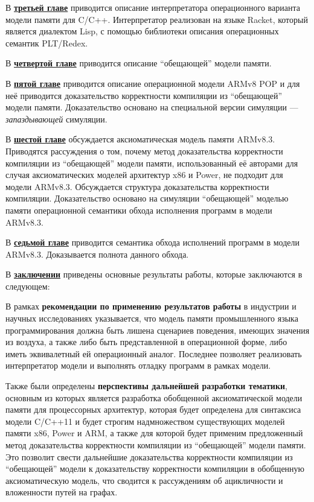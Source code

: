 В \underline{\textbf{третьей главе}} приводится описание интерпретатора операционного варианта модели памяти для C/C++.
Интерпретатор реализован на языке Racket, который является диалектом Lisp, с помощью библиотеки описания операционных
семантик PLT/Redex.

В \underline{\textbf{четвертой главе}} приводится описание ``обещающей'' модели памяти.

В \underline{\textbf{пятой главе}} приводится описание операционной модели ARMv8 POP и для неё
приводится доказательство корректности компиляции из ``обещающей'' модели памяти.
Доказательство основано на специальной версии симуляции --- \emph{запаздывающей} симуляции.

В \underline{\textbf{шестой главе}} обсуждается аксиоматическая модель памяти ARMv8.3.
Приводятся рассуждения о том, почему
метод доказательства корректности компиляции из ``обещающей'' модели памяти, использованный её авторами для случая
аксиоматических моделей архитектур x86 и Power, не подходит для модели ARMv8.3.
Обсуждается структура доказательства корректности компиляции. Доказательство основано на симуляции ``обещающей'' моделью
памяти операционной семантики обхода исполнения программ в модели ARMv8.3.

В \underline{\textbf{седьмой главе}} приводится семантика обхода исполнений программ в модели ARMv8.3. Доказывается
полнота данного обхода.

В \underline{\textbf{заключении}} приведены основные результаты работы, которые заключаются в следующем:


В рамках \textbf{рекомендации по применению результатов работы} в индустрии и научных исследованиях указывается,
что модель памяти промышленного языка программирования должна быть лишена сценариев поведения, имеющих значения
из воздуха, а также либо быть представленной в операционной форме, либо иметь эквивалетный ей операционный аналог.
Последнее позволяет реализовать интерпретатор модели и выполнять отладку программ в рамках модели.

Также были определены \textbf{перспективы дальнейшей разработки тематики}, основным из которых является
разработка обобщенной аксиоматической модели памяти для процессорных архитектур, которая будет
определена для синтаксиса модели C/C++11 и будет строгим надмножеством существующих моделей памяти
x86, Power и ARM, а также для которой будет применим предложенный метод доказательства корректности компиляции
из ``обещающей'' модели памяти. Это позволит свести дальнейшие доказательства корректности компиляции из
``обещающей'' модели к доказательству корректности компиляции в обобщенную аксиоматическую модель, что
сводится к рассуждениям об ацикличности и вложенности путей на графах.

